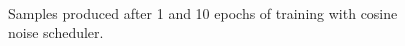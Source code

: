 \documentclass[fullpaper]{nldl}
\begin{document}
\begin{figure}[h!]
	\centering
	\\
	\caption{Samples produced after 1 and 10 epochs of training with cosine noise scheduler. \label{fig:cosine}}
\end{figure}
\end{document}

